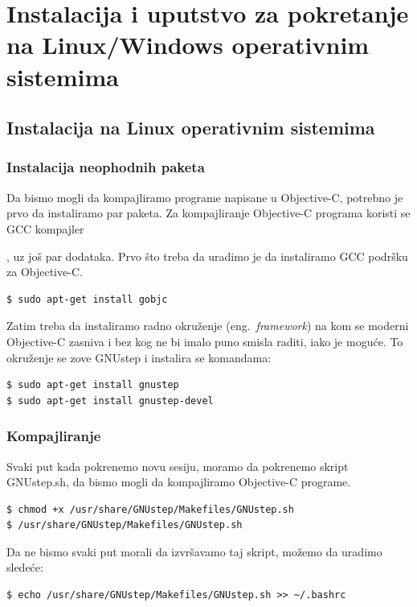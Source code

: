 \documentclass[a4paper]{article}
\begin{document}
{\section{Instalacija i uputstvo za pokretanje na Linux/Windows operativnim sistemima}
\label{sec:instalacija}
\subsection{Instalacija na Linux operativnim sistemima}
\subsubsection{Instalacija neophodnih paketa}
Da bismo mogli da kompajliramo programe napisane u Objective-C, potrebno je prvo da instaliramo
par paketa. Za kompajliranje Objective-C programa koristi se GCC kompajler{\cite{gcc}, uz još par
dodataka.
Prvo što treba da uradimo je da instaliramo GCC podršku za Objective-C.

\begin{lstlisting}[frame=single]
$ sudo apt-get install gobjc
\end{lstlisting}

Zatim treba da instaliramo radno okruženje (eng.~{\em framework}) na kom se moderni Objective-C zasniva i bez kog ne bi imalo puno smisla raditi, iako je moguće.
To okruženje se zove GNUstep \cite{gnustep} i instalira se komandama:

\begin{lstlisting}[frame=single]
$ sudo apt-get install gnustep
$ sudo apt-get install gnustep-devel
\end{lstlisting}

\subsubsection{Kompajliranje}
Svaki put kada pokrenemo novu sesiju, moramo da pokrenemo skript GNUstep.sh, da bismo mogli da kompajliramo Objective-C programe.
\begin{lstlisting}[frame=single]
$ chmod +x /usr/share/GNUstep/Makefiles/GNUstep.sh
$ /usr/share/GNUstep/Makefiles/GNUstep.sh
\end{lstlisting}

Da ne bismo svaki put morali da izvršavamo taj skript, možemo da uradimo sledeće:

\begin{lstlisting}[frame=single]
$ echo /usr/share/GNUstep/Makefiles/GNUstep.sh >> ~/.bashrc
\end{lstlisting}

}}
\end{document}
